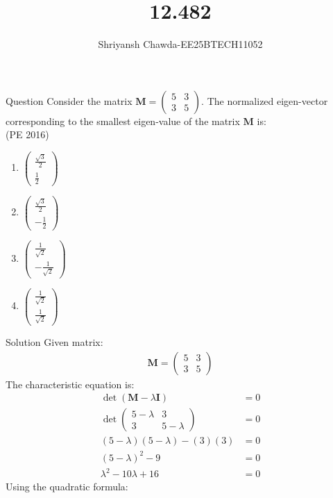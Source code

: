 \documentclass{beamer}
\title{12.482}
\author{Shriyansh Chawda-EE25BTECH11052}
\newcommand{\myvec}[1]{\ensuremath{\begin{pmatrix}#1\end{pmatrix}}}
\begin{document}
	
	\frame{\titlepage}
	
	\begin{frame}{Question}
			Consider the matrix $\mathbf{M} = \myvec{5 & 3\\3 & 5}$. The normalized eigen-vector corresponding to the smallest eigen-value of the matrix $\mathbf{M}$ is:\\
		\hfill{(PE 2016)}
		\begin{multicols}{4} 
			\begin{enumerate}
				\item $\begin{pmatrix} \frac{\sqrt{3}}{2} \\ \frac{1}{2} \end{pmatrix}$
				\item $\begin{pmatrix} \frac{\sqrt{3}}{2} \\ -\frac{1}{2} \end{pmatrix}$
				\item $\begin{pmatrix} \frac{1}{\sqrt{2}} \\ -\frac{1}{\sqrt{2}} \end{pmatrix}$
				\item $\begin{pmatrix} \frac{1}{\sqrt{2}} \\ \frac{1}{\sqrt{2}} \end{pmatrix}$
			\end{enumerate}
		\end{multicols} 
	\end{frame}
	
	\begin{frame}{Solution}
	Given matrix:
\begin{align}
	\mathbf{M} = \myvec{5 & 3\\3 & 5}
\end{align}
The characteristic equation is:
\begin{align}
	\det(\mathbf{M} - \lambda\mathbf{I}) &= 0\\
	\det\myvec{5-\lambda & 3\\3 & 5-\lambda} &= 0\\
	(5-\lambda)(5-\lambda) - (3)(3) &= 0\\
	(5-\lambda)^2 - 9 &= 0\\
	\lambda^2 - 10\lambda + 16 &= 0
\end{align}
Using the quadratic formula:

	\end{frame}
	
\end{document}
